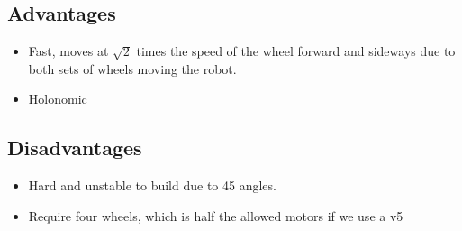 \documentclass[../../main.tex]{subfiles}
\begin{document}
\subsection{Advantages}

\begin{itemize} \item Fast, moves at $\sqrt{2}$ times the speed of the wheel forward and sideways due to both sets of wheels moving the robot.
	\item Holonomic

\end{itemize}

\subsection{Disadvantages}

\begin{itemize}
	\item Hard and unstable to build due to 45 \degree angles.
	\item Require four wheels, which is half the allowed motors
	      if we use a v5
\end{itemize}
\end{document}
